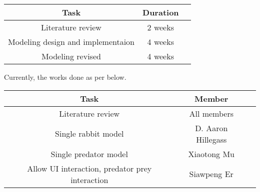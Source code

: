 \documentclass{article}
\begin{document}
\begin{normalsize}
		\begin{center}
			\begin{tabular}{ |c|c|c| } 
				\hline
				Task & Duration  \\ 
				\hline
				Literature review & 2 weeks \\ 
				Modeling design and implementaion & 4 weeks \\ 
				Modeling revised & 4 weeks \\ 
				\hline
			\end{tabular}
		\end{center}
		Currently, the works done as per below.
		\begin{center}
			\begin{tabular}{ |c|c|c| } 
				\hline
				Task & Member  \\ 
				\hline
				Literature review & All members\\			
				Single rabbit model & D. Aaron Hillegass\\ 
				Single predator model & Xiaotong Mu\\
				Allow UI interaction, predator prey interaction & Siawpeng Er\\
				\hline
			\end{tabular}
		\end{center}

		
		
		
	\end{normalsize}
	
\end{document}

